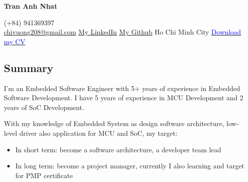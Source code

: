 \documentclass[11pt]{article}
\begin{document}

\begin{center}
    
\end{center}

\begin{header-container}

\end{header-container}

\begin{header-container}
    \begin{header-left}
        {\Huge \textbf{Tran Anh Nhat}}
    \end{header-left}
    
    \begin{header-right}
        (+84) 941369397 \\
        \href{mailto:chivuong208@gmail.com}{chivuong208@gmail.com}
        \href{https://www.linkedin.com/in/nhattrananh}{My LinkedIn}
        \href{https://github.com/Slytheril}{My Github}
        Ho Chi Minh City
        \href{https://github.com/Slytheril/Slytheril.github.io/releases/download/Release1.0/Nhat_CV.pdf}{\textcolor{blue}{Download my CV}}
    \end{header-right}
\end{header-container}

\subsection*{Summary}
I'm an Embedded Software Engineer with 5+ years of experience in Embedded Software Development. I have 5 years of experience in MCU Development and 2 years of SoC Development.

With my knowledge of Embedded System as design software architecture, low-level driver also application for MCU and SoC, my target:

\begin{itemize}
    \item In short term: become a software architecture, a developer team lead
    \item In long term: become a project manager, currently I also learning and target for PMP certificate
\end{itemize}
\end{document}
